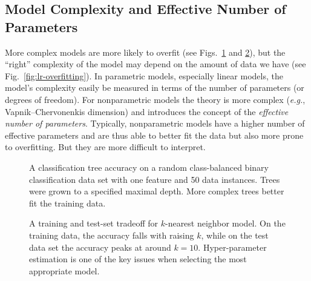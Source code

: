 \begin{refsection}
\subsection*{Model Complexity and Effective Number of Parameters}

More complex models are more likely to overfit (see Figs.~\ref{fig:tree-depth-overfit} and \ref{fig:knn-learning-curve}), but the ``right'' complexity of the model may depend on the amount of data we have (see Fig.~\ref{fig:lr-overfitting}). In parametric models, especially linear models, the model's complexity easily be measured in terms of the number of parameters (or degrees of freedom). For nonparametric models the theory is more complex ({\em e.g.}, Vapnik–Chervonenkis dimension) and introduces the concept of the {\em effective number of parameters}. Typically, nonparametric models have a higher number of effective parameters and are thus able to better fit the data but also more prone to overfitting. But they are more difficult to interpret.

\begin{figure}[htbp]
\caption{A classification tree accuracy on a random class-balanced binary classification data set with one feature and 50 data instances. Trees were grown to a specified maximal depth. More complex trees better fit the training data.}
\label{fig:tree-depth-overfit}
\end{figure}

\begin{figure}[htbp]
\caption{A training and test-set tradeoff for $k$-nearest neighbor model. On the training data, the accuracy falls with raising $k$, while on the test data set the accuracy peaks at around $k=10$. Hyper-parameter estimation is one of the key issues when selecting the most appropriate model.}
\label{fig:knn-learning-curve}
\end{figure}



\end{refsection}
